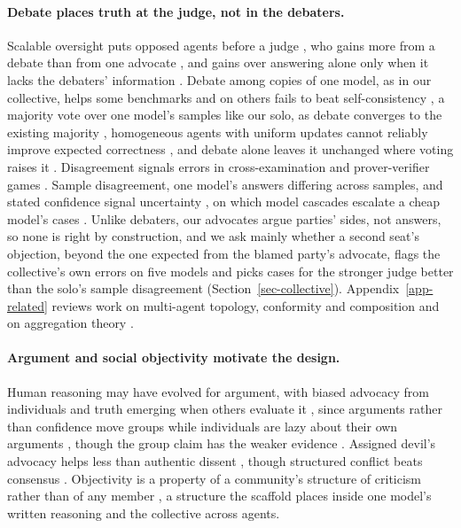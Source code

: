 \paragraph{Debate places truth at the judge, not in the debaters.}
Scalable oversight puts opposed agents before a judge \citep{irving18}, who gains more from a debate than from one advocate
\citep{michael2023debate,khan2024debating}, and gains over answering alone only
when it lacks the debaters' information \citep{kenton2024scalable}.
Debate among copies of one model, as in our collective, helps some
benchmarks \citep{du23,liang2024divergent,chan2023chateval} and on others
\citep{smit2024mad,wang2024rethinking} fails to beat self-consistency
\citep{wang2023selfconsistency}, a majority vote over one model's samples like
our solo, as debate converges to the existing
majority \citep{estornell2024multillm}, homogeneous
agents with uniform updates cannot reliably improve expected correctness
\citep{zhu2026demystifying}, and debate alone leaves it unchanged where voting
raises it \citep{choi2025debateorvote}.
Disagreement signals errors in cross-examination
\citep{cohen2023lmvslm} and prover-verifier games \citep{kirchner2024prover}.
Sample disagreement, one model's answers differing across samples, and stated
confidence signal uncertainty
\citep{manakul2023selfcheck,farquhar2024semantic,xiong2024confidence}, on
which model cascades escalate a cheap model's cases
\citep{chen2023frugal,jitkrittum2023deferral,gupta2024cascades,yue2024cascades,aggarwal2024automix,jung2025escalate,wang2026defer}.
Unlike debaters, our advocates argue parties' sides, not answers, so
none is right by construction, and we ask mainly whether a second seat's
objection, beyond the one expected from the blamed party's advocate, flags
the collective's own errors on five models and picks cases for the stronger
judge better than the solo's sample disagreement (Section~\ref{sec-collective}).
Appendix~\ref{app-related} reviews work on multi-agent topology, conformity
and composition and on aggregation theory
\citep{ladha1992condorcet,list2002aggregating}.

\paragraph{Argument and social objectivity motivate the design.}
Human reasoning may have evolved for argument, with biased advocacy from
individuals and truth emerging when others evaluate it
\citep{mercier2011argumentative,mercier2017enigma}, since arguments rather
than confidence move groups \citep{trouche2014arguments} while individuals are
lazy about their own arguments \citep{trouche2016selective}, though the group
claim has the weaker evidence \citep{mercier2016predictions}.
Assigned devil's advocacy helps less than authentic dissent
\citep{nemeth2001devil}, though structured conflict beats consensus
\citep{schweiger1986group,schwenk1990effects}. Objectivity is a
property of a community's structure of criticism rather than of any member
\citep{longino1990science,longino2002fate,popper2011open}, a structure the
scaffold places inside one model's written reasoning and the collective across agents.
